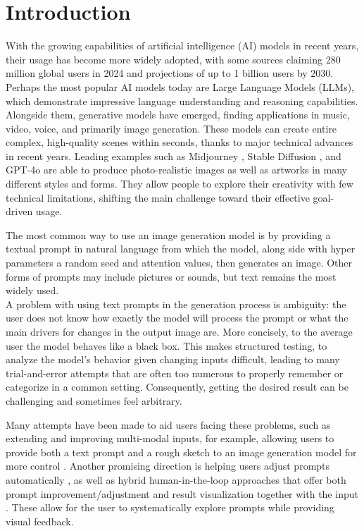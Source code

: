 \documentclass[
  a4paper,  %
  twoside,  %
  bibliography=totoc,
  headsepline,
  cleardoublepage=empty,
  parskip=half,
  draft=false
]{scrbook}
\begin{document}
%
%


\chapter{Introduction}
\label{sec:introduction}
With the growing capabilities of artificial intelligence (AI) models in recent years, their usage has become more widely adopted, with some sources claiming 280 million global users in 2024 \cite{AI-users} and projections of up to 1 billion users by 2030. Perhaps the most popular AI models today are Large Language Models (LLMs), which demonstrate impressive language understanding and reasoning capabilities. Alongside them, generative models have emerged, finding applications in music, video, voice, and primarily image generation. These models can create entire complex, high-quality scenes within seconds, thanks to major technical advances in recent years. Leading examples such as Midjourney \cite{midjourney}, Stable Diffusion \cite{stable-diffusion}, and GPT-4o \cite{GPT-4o} are able to produce photo-realistic images as well as artworks in many different styles and forms. They allow people to explore their creativity with few technical limitations, shifting the main challenge toward their effective goal-driven usage.

The most common way to use an image generation model is by providing a textual prompt in natural language from which the model, along side with hyper parameters a random seed and attention values, then generates an image. Other forms of prompts may include pictures or sounds, but text remains the most widely used.\\
 A problem with using text prompts in the generation process is ambiguity: the user does not know how exactly the model will process the prompt or what the main drivers for changes in the output image are. More concisely, to the average user the model behaves like a black box. This makes structured testing, to analyze the model's behavior given changing inputs difficult, leading to many trial-and-error attempts that are often too numerous to properly remember or categorize in a common setting. Consequently, getting the desired result can be challenging and sometimes feel arbitrary.

Many attempts have been made to aid users facing these problems, such as extending and improving multi-modal inputs, for example, allowing users to provide both a text prompt and a rough sketch to an image generation model for more control \cite{lin2025sketchflexfacilitatingspatialsemanticcoherence}. Another promising direction is helping users adjust prompts automatically \cite{10.1145/3729176.3729203,You2024Aesthetic}, as well as hybrid human-in-the-loop approaches that offer both prompt improvement/adjustment and result visualization together with the input \cite{PromptMagician,mishra2025promptaidpromptexplorationperturbation,brade2023promptifytexttoimagegenerationinteractive,guo2024prompthisvisualizingprocessinfluence,promptCharm}.
These allow for the user to systematically explore prompts while providing visual feedback.
\end{document}
